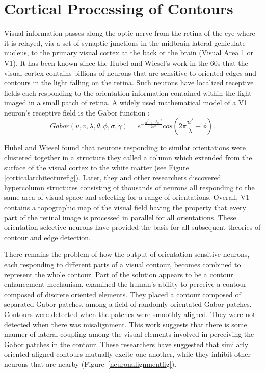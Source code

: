 \documentclass[prodmode,hillsideplop]{../acmlarge}
\begin{document}
\section{Cortical Processing of Contours}
Visual information passes along the optic nerve from the retina of
the eye where it is relayed, via a set of synaptic junctions in the
midbrain lateral geniculate nucleus, to the primary visual cortex at
the back or the brain (Visual Area 1 or V1). It has been known since
the Hubel and Wiesel's work in the 60s that the visual cortex
contains billions of neurons that are sensitive to oriented edges and
contours in the light falling on the retina. Such neurons have
localized receptive fields each responding to the orientation
information contained within the light imaged in a small patch of
retina. A widely used mathematical model of a V1 neuron's receptive
field is the Gabor function \cite{Daugman1985}:
\begin{equation}
\label{gaboreqn}
Gabor(u,v,\lambda,\theta,\phi,\sigma,\gamma)=e^{-\frac{u'^{2}+
\gamma^{2}v'^{2}}{2\sigma^{2}}}cos(2\pi\frac{u'}{\lambda}+\phi).
\end{equation}

Hubel and Wiesel \citeyear{Hubel1962,Hubel1968} found that neurons
responding to similar orientations were clustered together in a
structure they called a column which extended from the surface of the
visual cortex to the white matter (see Figure
\ref{corticalarchitecturefig}). Later, they and other researchers
discovered hypercolumn structures consisting of thousands of neurons
all responding to the same area of visual space and selecting for a
range of orientations. Overall, V1 contains a topographic map of the
visual field having the property that every part of the retinal image
is processed in parallel for all orientations. These orientation
selective neurons have provided the basis for all subsequent theories
of contour and edge detection.

There remains the problem of how the output of orientation sensitive
neurons, each responding to different parts of a visual contour,
becomes combined to represent the whole contour. Part of the solution
appears to be a contour enhancement mechanism. 
examined the human's ability to perceive a contour composed of
discrete oriented elements. They placed a contour composed of
separated Gabor patches, among a field of randomly orientated Gabor
patches. Contours were detected when the patches were smoothly
aligned. They were not detected when there was misalignment. This
work suggests that there is some manner of lateral coupling among the
visual elements involved in perceiving the Gabor patches in the
contour. These researchers have suggested that similarly oriented
aligned contours mutually excite one another, while they inhibit
other neurons that are nearby (Figure~\ref{neuronalignmentfig}).
\end{document}
